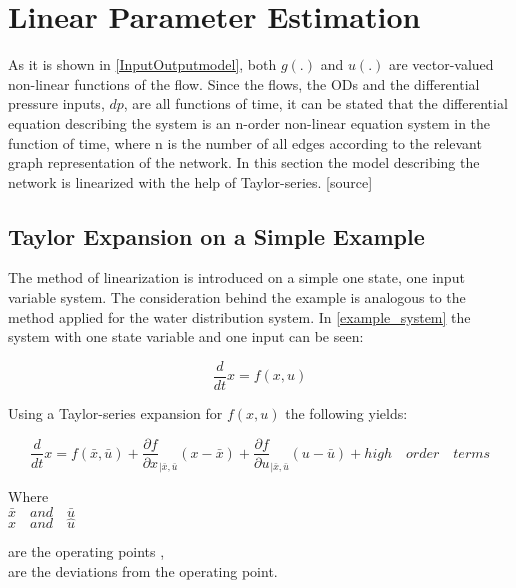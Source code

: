 \section{Linear Parameter Estimation} 
\label{LinParamEst}

As it is shown in \eqref{InputOutputmodel}, both $g(.)$ and $u(.)$ are vector-valued non-linear functions of the flow. Since the flows, the ODs and the differential pressure inputs, $dp$, are all functions of time, it can be stated that the differential equation describing the system is an n-order non-linear equation system in the function of time, where n is the number of all edges according to the relevant graph representation of the network. In this section the model describing the network is linearized with the help of Taylor-series. [source] 

\subsection{Taylor Expansion on a Simple Example}
 \label{Taylorexamplesection}

The method of linearization is introduced on a simple one state, one input variable system. The consideration behind the example is analogous to the method applied for the water distribution system. In \eqref{example_system} the system with one state variable and one input can be seen: 

\begin{equation}
\frac{d}{dt} x = f(x,u)
 \label{example_system}
\end{equation}

Using a Taylor-series expansion for $f(x,u)$ the following yields: 

\begin{equation}
\frac{d}{dt} x = f(\bar{x},\bar{u}) + \frac{\partial f}{\partial x}_{|\bar{x}, \bar{u}} (x-\bar{x}) + \frac{\partial f}{\partial u}_{|\bar{x}, \bar{u}} (u-\bar{u}) + high \quad order \quad terms  
 \label{TaylorExpansion}
\end{equation}

\begin{minipage}[t]{0.20\textwidth}
Where\\
\hspace*{8mm} $\bar{x} \quad and \quad \bar{u}$ \\
\hspace*{8mm} $\hat{x} \quad and \quad \hat{u}$ 
\end{minipage}
\begin{minipage}[t]{0.68\textwidth}
\vspace*{2mm}
are the operating points ,\\
are the deviations from the operating point.
\end{minipage}

